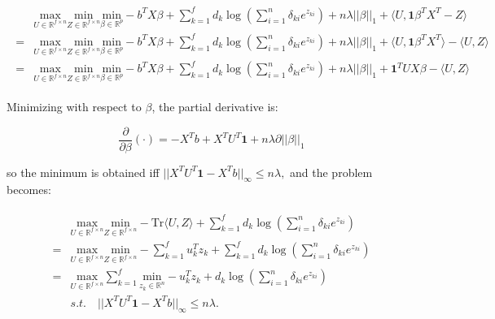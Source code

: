 \documentclass{article}
\begin{document}
\begin{gather}
    \label{eq:dual+u}
    \begin{aligned}
        &\underset{U\in \mathbb{R}^{f\times n}}{\mathrm{max}}\underset{Z\in \mathbb{R}^{f\times n}}{\mathrm{min}}\underset{\beta\in \mathbb{R}^p}{\mathrm{min}}-b^TX\beta+\sum_{k=1}^f d_k\log\left(\sum_{i=1}^n \delta_{ki} e^{z_{ki}}\right)+n\lambda||\beta||_1+\langle U,\mathbf{1}\beta^TX^T-Z\rangle\\
        =&\underset{U\in \mathbb{R}^{f\times n}}{\mathrm{max}}\underset{Z\in \mathbb{R}^{f\times n}}{\mathrm{min}}\underset{\beta\in \mathbb{R}^p}{\mathrm{min}}-b^TX\beta+\sum_{k=1}^f d_k\log\left(\sum_{i=1}^n \delta_{ki} e^{z_{ki}}\right)+n\lambda||\beta||_1+\langle U,\mathbf{1}\beta^TX^T\rangle-\langle U,Z\rangle\\
        =&\underset{U\in \mathbb{R}^{f\times n}}{\mathrm{max}}\underset{Z\in \mathbb{R}^{f\times n}}{\mathrm{min}}\underset{\beta\in \mathbb{R}^p}{\mathrm{min}}-b^TX\beta+\sum_{k=1}^f d_k\log\left(\sum_{i=1}^n \delta_{ki} e^{z_{ki}}\right)+n\lambda||\beta||_1+\mathbf{1}^TUX\beta-\langle U,Z\rangle
    \end{aligned}    
\end{gather}


Minimizing with respect to $\beta$, the partial derivative is:

\begin{equation}
    \label{eq:partialbeta}
    \frac{\partial}{\partial\beta}(\cdot) =-X^Tb+X^TU^T\mathbf{1}+n\lambda\partial||\beta||_1
\end{equation}

so the minimum is obtained iff $
    ||X^TU^T\mathbf{1}-X^Tb||_\infty\leq n\lambda,$ and the problem becomes:

\begin{gather}
    \label{eq:dual-beta}
    \begin{aligned}
        &\underset{U\in \mathbb{R}^{f\times n}}{\mathrm{max}}\underset{Z\in \mathbb{R}^{f\times n}}{\mathrm{min}}-\textrm{Tr} \langle U,Z\rangle+\sum_{k=1}^f d_k\log\left(\sum_{i=1}^n \delta_{ki} e^{z_{ki}}\right)\\
        =&\underset{U\in \mathbb{R}^{f\times n}}{\mathrm{max}}\underset{Z\in \mathbb{R}^{f\times n}}{\mathrm{min}}-\sum_{k=1}^f u_k^Tz_k +\sum_{k=1}^f d_k\log\left(\sum_{i=1}^n \delta_{ki} e^{z_{ki}}\right)\\
        =&\underset{U\in \mathbb{R}^{f\times n}}{\mathrm{max}}\sum_{k=1}^f\underset{z_k\in \mathbb{R}^n}{\mathrm{min}}-u_k^Tz_k+d_k\log\left(\sum_{i=1}^n \delta_{ki} e^{z_{ki}}\right)\\
        &s.t.\quad ||X^TU^T\mathbf{1}-X^Tb||_\infty\leq n\lambda.
    \end{aligned}
\end{gather}
\end{document}
